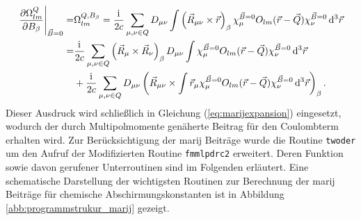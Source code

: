 	\begin{equation}\label{eq:multipoledb}
	\begin{aligned}
	\left.\frac{\partial \Omega^Q_{lm}}{\partial B_\beta}\right\vert_{\vec{B}=0}=&\Omega^{Q,B_\beta}_{lm}=\frac{\mathrm{i}\mkern1mu}{2c}\sum_{\mu,\nu \in Q}D_{\mu\nu}\int\left(\vec{R}_{\mu\nu}\times\vec{r}\right)_\beta\chi_\mu^{\vec{B}=0} O_{lm}(\vec{r}-\vec{Q})\chi_{\nu}^{\vec{B}=0}\mathop{}\!\mathrm{d^3} \vec{r}\\
	=&\frac{\mathrm{i}\mkern1mu}{2c}\sum_{\mu,\nu \in Q}\left(\vec{R}_{\mu}\times\vec{R}_{\nu}\right)_\beta D_{\mu\nu}\int\chi_\mu^{\vec{B}=0}O_{lm}(\vec{r}-\vec{Q})\chi_{\nu}^{\vec{B}=0}\mathop{}\!\mathrm{d^3}\vec{r}\\
	&+\frac{\mathrm{i}\mkern1mu}{2c}\sum_{\mu,\nu \in Q}D_{\mu\nu}\left(\vec{R}_{\mu\nu}\times\int\vec{r}_{\mu}\chi_\mu^{\vec{B}=0}O_{lm}(\vec{r}-\vec{Q})\chi_{\nu}^{\vec{B}=0}\mathop{}\!\mathrm{d^3}\vec{r}\right)_\beta .
	\end{aligned}
	\end{equation}
	Dieser Ausdruck wird schließlich in Gleichung (\ref{eq:marijexpansion}) eingesetzt, wodurch der durch Multipolmomente genäherte Beitrag für den Coulombterm erhalten wird. Zur Berücksichtigung der \ac{marij} Beiträge wurde die Routine \texttt{twoder} um den Aufruf der Modifizierten Routine \texttt{fmmlpdrc2} erweitert. Deren Funktion sowie davon gerufener Unterroutinen sind im Folgenden erläutert. Eine schematische Darstellung der wichtigsten Routinen zur Berechnung der \ac{marij} Beiträge für chemische Abschirmungskonstanten ist in Abbildung \ref{abb:programmstrukur_marij} gezeigt.
